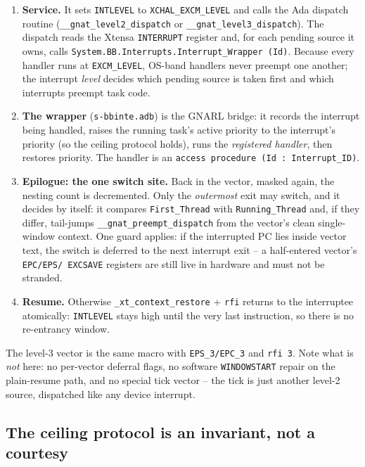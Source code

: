 \begin{enumerate}
        never land on task stacks.
  \item \textbf{Service.} It sets \texttt{INTLEVEL} to
        \texttt{XCHAL\_EXCM\_LEVEL} and calls the Ada dispatch routine
        (\texttt{\_\_gnat\_level2\_dispatch} or
        \texttt{\_\_gnat\_level3\_dispatch}). The dispatch reads the Xtensa
        \texttt{INTERRUPT} register and, for each pending source it owns,
        calls \texttt{System.BB.Interrupts.Interrupt\_Wrapper (Id)}. Because
        every handler runs at \texttt{EXCM\_LEVEL}, OS-band handlers never
        preempt one another; the interrupt \emph{level} decides which pending
        source is taken first and which interrupts preempt task code.
  \item \textbf{The wrapper} (\texttt{s-bbinte.adb}) is the GNARL bridge: it
        records the interrupt being handled, raises the running task's active
        priority to the interrupt's priority (so the ceiling protocol holds),
        runs the \emph{registered handler}, then restores priority. The
        handler is an \texttt{access procedure (Id : Interrupt\_ID)}.
  \item \textbf{Epilogue: the one switch site.} Back in the vector, masked
        again, the nesting count is decremented. Only the \emph{outermost}
        exit may switch, and it decides by itself: it compares
        \texttt{First\_Thread} with \texttt{Running\_Thread} and, if they
        differ, tail-jumps \texttt{\_\_gnat\_preempt\_dispatch} from the
        vector's clean single-window context. One guard applies: if the
        interrupted PC lies inside vector text, the switch is deferred to the
        next interrupt exit -- a half-entered vector's \texttt{EPC/EPS/%
EXCSAVE} registers are still live in hardware and must not be stranded.
  \item \textbf{Resume.} Otherwise \texttt{\_xt\_context\_restore} +
        \texttt{rfi} returns to the interruptee atomically:
        \texttt{INTLEVEL} stays high until the very last instruction, so
        there is no re-entrancy window.
\end{enumerate}

The level-3 vector is the same macro with \texttt{EPS\_3/EPC\_3} and
\texttt{rfi 3}. Note what is \emph{not} here: no per-vector deferral flags,
no software \texttt{WINDOWSTART} repair on the plain-resume path, and no
special tick vector -- the tick is just another level-2 source, dispatched
like any device interrupt.

\subsection{The ceiling protocol is an invariant, not a courtesy}

